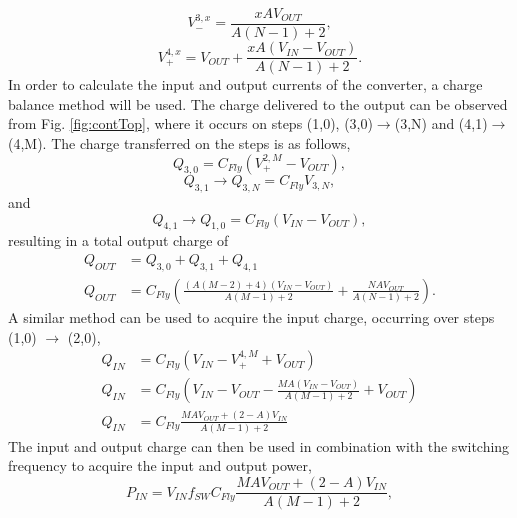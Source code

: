 \documentclass[conference]{IEEEtran}
\begin{document}
	\begin{equation}
	V_{-}^{3,x} = \frac{xAV_{OUT}}{A(N-1) + 2},
	\end{equation}
	\begin{equation}
	V_{+}^{4,x} = V_{OUT} + \frac{xA(V_{IN} -V_{OUT})}{A(N-1) + 2}.
	\end{equation}
	In order to calculate the input and output currents of the converter, a charge balance method will be used. The charge delivered to the output can be observed from Fig. \ref{fig:contTop}, where it occurs on steps (1,0), (3,0)$\rightarrow$(3,N) and (4,1)$\rightarrow$(4,M). The charge transferred on the steps is as follows,
	\begin{equation}
	Q_{3,0} = C_{Fly}(V_+^{2,M} - V_{OUT}),
	\end{equation}
	\begin{equation}
	Q_{3,1} \rightarrow  Q_{3,N} = C_{Fly}V_{3,N},
	\end{equation}
	and
	\begin{equation}
	Q_{4,1} \rightarrow  Q_{1,0} = C_{Fly}(V_{IN} - V_{OUT}),
	\end{equation}
	resulting in a total output charge of 
	\begin{equation}
	\begin{split}
	Q_{OUT}\! &= Q_{3,0} + Q_{3,1} + Q_{4,1}\\
	Q_{OUT}\! &= \! C_{Fly}\!\left(\tfrac{(A(M-2) + 4)(V_{IN} - V_{OUT})}{A(M-1) + 2}\! + \! \tfrac{NAV_{OUT}}{A(N-1) + 2}\right).
	\end{split}
 	\end{equation}
 	A similar method can be used to acquire the input charge, occurring over steps (1,0) $\rightarrow$ (2,0),
 	\begin{equation}
 	\begin{split}
 	Q_{IN} &= C_{Fly}\left(V_{IN} - V_+^{4,M} + V_{OUT}\right) \\
 	Q_{IN} &= C_{Fly}\!\left(V_{IN} - V_{OUT} - \tfrac{MA(V_{IN}\! -\!V_{OUT})}{A(M-1) + 2} + V_{OUT}\!\right) \\
 	Q_{IN} &= C_{Fly}\frac{MAV_{OUT} + (2-A)V_{IN}}{A(M-1) + 2}
 	\end{split}
 	\end{equation}
 	The input and output charge can then be used in combination with the switching frequency to acquire the input and output power,
 	\begin{equation}
 	P_{IN} = V_{IN}f_{SW}C_{Fly}\frac{MAV_{OUT} + (2-A)V_{IN}}{A(M-1) + 2},
 	\label{eq:P_IN}
 	\end{equation}
 	
\end{document}

